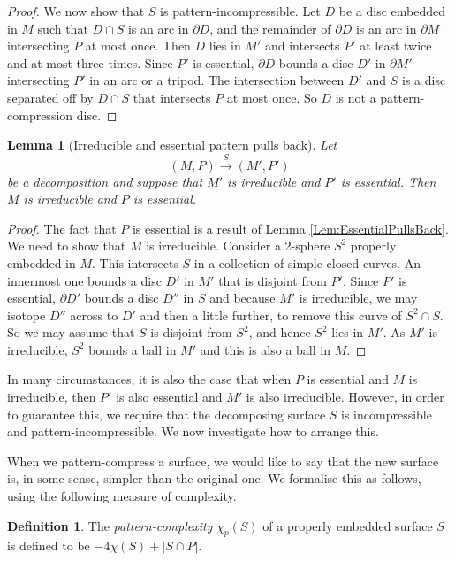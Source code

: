 \documentclass[oneside]{amsart}
\numberwithin{equation}{section}
\theoremstyle{plain}
\newtheorem{lemma}[equation]{Lemma}
\theoremstyle{definition}
\newtheorem{definition}[equation]{Definition}
\begin{document}
\begin{proof}
We now show that $S$ is pattern-incompressible. Let $D$ be a disc embedded in $M$ such that $D \cap S$ is an arc in $\partial D$, and the remainder of $\partial D$ is an arc in $\partial M$ intersecting $P$ at most once. Then $D$ lies in $M'$ and intersects $P'$ at least twice and at most three times. Since $P'$ is essential, $\partial D$ bounds a disc $D'$ in $\partial M'$ intersecting $P'$ in an arc or a tripod.
The intersection between $D'$ and $S$ is a disc separated off by $D \cap S$ that intersects $P$ at most once. So $D$ is not a pattern-compression disc.
\end{proof}

\begin{lemma}[Irreducible and essential pattern pulls back]
\label{Lem:EssentialIrredPullsBack}
Let 
$$(M, P) \xrightarrow{S} (M', P')$$
be a decomposition and suppose that $M'$ is irreducible and $P'$ is essential. Then $M$ is irreducible and $P$ is essential.
\end{lemma}

\begin{proof}
The fact that $P$ is essential is a result of Lemma \ref{Lem:EssentialPullsBack}. We need to show that $M$ is irreducible. 
Consider a 2-sphere $S^2$ properly embedded in $M$. This intersects $S$ in a collection of simple closed curves. An innermost one bounds a disc $D'$ in $M'$ that is disjoint from $P'$. Since $P'$ is essential, $\partial D'$ bounds a disc $D''$ in $S$ and because $M'$ is irreducible, we may isotope $D''$ across to $D'$ and then a little further, to remove this curve of $S^2 \cap S$. So we may assume that $S$ is disjoint from $S^2$, and hence $S^2$ lies in $M'$. As $M'$ is irreducible, $S^2$ bounds a ball in $M'$ and this is also a ball in $M$.
\end{proof}

In many circumstances, it is also the case that when $P$ is essential and $M$ is irreducible, then $P'$ is also essential and $M'$ is also irreducible. However, in order to guarantee this, we require that the decomposing surface $S$ is incompressible and pattern-incompressible. We now investigate how to arrange this.


When we pattern-compress a surface, we would like to say that the new surface is, in some sense, simpler than the
original one. We formalise this as follows, using the following measure of complexity.

\begin{definition}
The \emph{pattern-complexity} $\chi_p(S)$ of a properly embedded surface $S$ is defined to be $-4\chi(S) + |S \cap P|$.
\end{definition}
\end{document}
